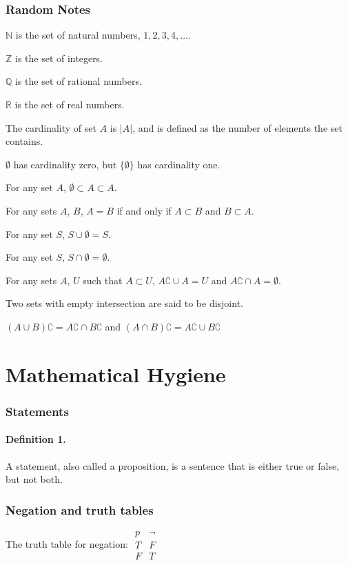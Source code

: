 \documentclass{report}
\begin{document}
\subsection*{Random Notes}
\par\noindent $\mathbb{N}$ is the set of natural numbers, $1,2,3,4,\ldots$.
\par\noindent $\mathbb{Z}$ is the set of integers.
\par\noindent $\mathbb{Q}$ is the set of rational numbers.
\par\noindent $\mathbb{R}$ is the set of real numbers.
\par\noindent The cardinality of set $A$ is $|A|$, and is defined as the number of elements the set contains.
\par\noindent $\emptyset{}$ has cardinality zero, but $\{\emptyset\}$ has cardinality one.
\par\noindent For any set $A$, $\emptyset\subset{}A\subset{}A$.
\par\noindent For any sets $A$, $B$, $A=B$ if and only if $A\subset{}B$ and $B\subset{}A$.
\par\noindent For any set $S$, $S\cup\emptyset{}=S$.
\par\noindent For any set $S$, $S\cap\emptyset{}=\emptyset$.
\par\noindent For any sets $A$, $U$ such that $A\subset{}U$, $A\complement\cup{}A=U$ and $A\complement\cap{}A=\emptyset$.
\par\noindent Two sets with empty intersection are said to be disjoint.
\par\noindent $(A\cup{}B)\complement{}=A\complement\cap{}B\complement$ and $(A\cap{}B)\complement{}=A\complement\cup{}B\complement$

\chapter*{Mathematical Hygiene}
\subsection*{Statements}
\subsubsection*{Definition 1.}
\par\noindent A statement, also called a proposition, is a sentence that is either true or false, but not both.
\subsection*{Negation and truth tables}
\par\noindent The truth table for negation: $\begin{array}{c||c} p & \neg \\ \hline T & F \\ F & T \end{array}$
\end{document}

